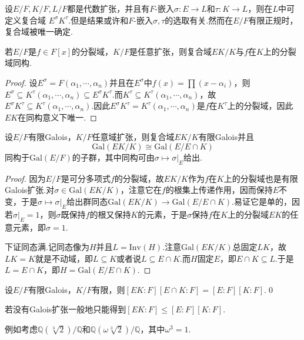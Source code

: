 设$E/F,K/F,L/F$都是代数扩张，并且有$F$-嵌入$\sigma\colon E\to L$和$\tau\colon K\to L$，则在$L$中可定义{\heiti 复合域} $E^\sigma K^\tau$.但是结果或许和$F$-嵌入$\sigma,\tau$的选取有关.然而在$E/F$有限正规时，复合域被唯一确定.
\begin{lemma*}
    若$E/F$是$f\in F[x]$的分裂域，$K/F$是任意扩张，则复合域$EK/K$与$f$在$K$上的分裂域同构.
\end{lemma*}
\begin{proof}
    设$E^\sigma=F(\alpha_1,\cdots,\alpha_n)$并且在$E^\sigma$中$f(x)=\prod(x-\alpha_i)$，则$E^\sigma\subseteq K^\tau(\alpha_1,\cdots,\alpha_n)\subseteq E^\sigma K^\tau$.而$K^\tau\subseteq K^\tau(\alpha_1,\cdots,\alpha_n)$，故$E^\sigma K^\tau\subseteq K^\tau(\alpha_1,\cdots,\alpha_n)$.因此$E^\sigma K^\tau=K^\tau(\alpha_1,\cdots,\alpha_n)$是$f$在$K^\tau$上的分裂域，因此$EK$在同构意义下唯一.
\end{proof}
\begin{thm}
    设$E/F$有限Galois，$K/F$任意域扩张，则复合域$EK/K$有限Galois并且
    \[
        \mathrm{Gal}(EK/K)\cong\mathrm{Gal}(E/E\cap K)
    \]
    同构于$\mathrm{Gal}(E/F)$的子群，其中同构可由$\sigma\mapsto\sigma|_E$给出.
\end{thm}
\begin{proof}
    因为$E/F$是可分多项式$f$的分裂域，故$EK/K$作为$f$在$K$上的分裂域也是有限Galois扩张.对$\sigma\in\mathrm{Gal}(EK/K)$，注意它在$f$的根集上传递作用，因而保持$E$不变，于是$\sigma\mapsto\sigma|_E$给出群同态$\mathrm{Gal}(EK/K)\to\mathrm{Gal}(E/E\cap K)$.易证它是单的，因若$\sigma|_E=1$，则$\sigma$既保持$f$的根又保持$K$的元素，于是$\sigma$保持$f$在$K$上的分裂域$EK$的任意元素，即$\sigma=1$.

    下证同态满.记同态像为$H$并且$L=\mathrm{Inv}(H)$.注意$\mathrm{Gal}(EK/K)$总固定$LK$，故$LK=K$就是不动域，即$L\subseteq K$或者说$L\subseteq E\cap K$.而$H$固定$E$，即$E\cap K\subseteq L$.于是$L=E\cap K$，即$H=\mathrm{Gal}(E/E\cap K)$.
\end{proof}
\begin{cor*}
    设$E/F$有限Galois，$K/F$有限，则$[EK:F][E\cap K:F]=[E:F][K:F]$.\qed
\end{cor*}
\begin{remark}
    若没有Galois扩张一般地只能得到$[EK:F]\le[E:F][K:F]$.
    
    例如考虑$\mathbb{Q}(\sqrt[3]{2})/\mathbb{Q}$和$\mathbb{Q}(\omega\sqrt[3]{2})/\mathbb{Q}$，其中$\omega^3=1$.
\end{remark}

